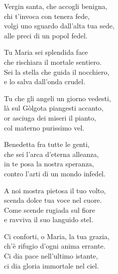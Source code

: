 
\strofa Vergin santa, che accogli benigna,\\
chi t'invoca con tenera fede,\\
volgi uno sguardo dall'alta tua sede,\\
alle preci di un popol fedel.

\spazio


\spazio

\strofa Tu Maria sei splendida face\\
che rischiara il mortale sentiero.\\
Sei la stella che guida il nocchiero,\\
e lo salva dall'onda crudel.

\spazio


\spazio

\strofa Tu che gli angeli un giorno vedesti,\\
là sul Gòlgota piangesti accanto,\\
or asciuga dei miseri il pianto,\\
col materno purissimo vel.

\spazio


\spazio

\strofa Benedetta fra tutte le genti,\\
che sei l'arca d'eterna alleanza,\\
in te posa la nostra speranza,\\
contro l'arti di un mondo infedel.

\spazio


\spazio

\strofa A noi mostra pietosa il tuo volto,\\
scenda dolce tua voce nel cuore.\\
Come scende rugiada sul fiore\\
e ravviva il suo languido stel.

\spazio


\spazio

\strofa Ci conforti, o Maria, la tua grazia,\\
ch'è rifugio d'ogni anima errante.\\
Ci dia pace nell'ultimo istante,\\
ci dia gloria immortale nel ciel.

\spazio

